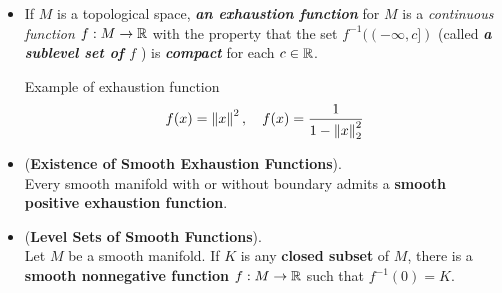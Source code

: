 \documentclass[11pt]{article}
\begin{document}
\begin{itemize}
\item \begin{definition} 
If $M$ is a topological space, \emph{\textbf{an exhaustion function}} for $M$ is a \emph{continuous function} $f: M \rightarrow {\mathbb R}$ with the property that the set $f^{-1}((-\infty, c])$ (called \emph{\textbf{a sublevel set of $f$}} ) is \emph{\textbf{compact}} for each $c \in {\mathbb R}$. 
\end{definition}
Example of exhaustion function
\begin{align*}
f(x) = \left\|x\right\|_{}^2, \quad f(x) = \frac{1}{1- \left\|x\right\|_{2}^2}
\end{align*}

\item \begin{proposition} (\textbf{Existence of Smooth Exhaustion Functions}).   \citep{lee2003introduction}\\
Every smooth manifold with or without boundary admits a \textbf{smooth positive exhaustion function}.
\end{proposition}

\item \begin{theorem} (\textbf{Level Sets of Smooth Functions}).  \citep{lee2003introduction}\\
 Let $M$ be a smooth manifold. If $K$ is any \textbf{closed subset} of $M$, there is a \textbf{smooth nonnegative function} $f: M \rightarrow {\mathbb R}$
such that $f^{-1}(0) =  K$.
\end{theorem}
\end{itemize}
\newpage


\end{document}
